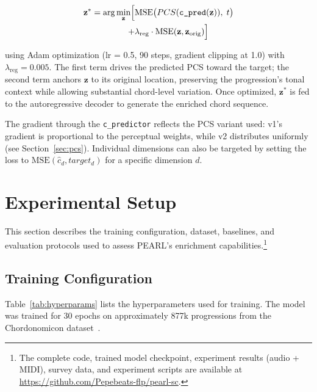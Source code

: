 \documentclass[conference]{IEEEtran}
\begin{document}
\begin{equation}
\begin{split}
\mathbf{z}^* = \arg\min_{\mathbf{z}} \Bigl[ &\text{MSE}\bigl(PCS(\texttt{c\_pred}(\mathbf{z})),\; t\bigr) \\
                                           + &\lambda_{\text{reg}} \cdot \text{MSE}(\mathbf{z}, \mathbf{z}_{\text{orig}}) \Bigr]
\end{split}
\label{eq:grad_ascent}
\end{equation}

using Adam optimization (lr = 0.5, 90 steps, gradient clipping at 1.0) with $\lambda_{\text{reg}} = 0.005$. The first term drives the predicted PCS toward the target; the second term anchors $\mathbf{z}$ to its original location, preserving the progression's tonal context while allowing substantial chord-level variation. Once optimized, $\mathbf{z}^*$ is fed to the autoregressive decoder to generate the enriched chord sequence.

The gradient through the \texttt{c\_predictor} reflects the PCS variant used: v1's gradient is proportional to the perceptual weights, while v2 distributes uniformly (see Section~\ref{sec:pcs}). Individual dimensions can also be targeted by setting the loss to $\text{MSE}(\hat{c}_d, target_d)$ for a specific dimension $d$.

\section{Experimental Setup}

This section describes the training configuration, dataset, baselines, and evaluation protocols used to assess PEARL's enrichment capabilities.\footnote{The complete code, trained model checkpoint, experiment results (audio + MIDI), survey data, and experiment scripts are available at \url{https://github.com/Pepebeats-flp/pearl-sc}.}

\subsection{Training Configuration}

Table~\ref{tab:hyperparams} lists the hyperparameters used for training. The model was trained for 30 epochs on approximately 877k progressions from the Chordonomicon dataset~\cite{kantarelis2024chordonomicon}.
\end{document}
